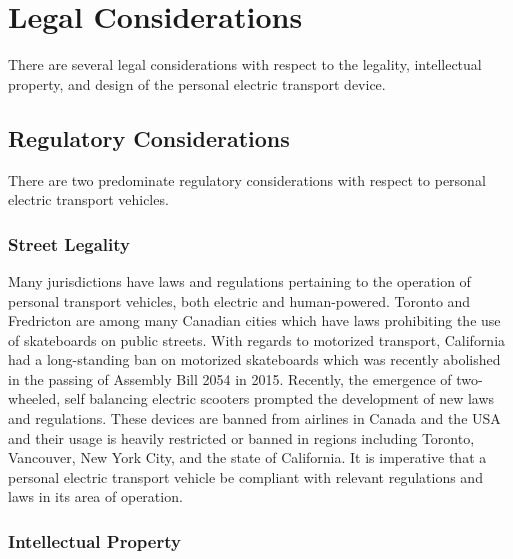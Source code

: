 \documentclass[12pt,letterpaper]{article}
\begin{document}
	
\section{Legal Considerations}
There are several legal considerations with respect to the legality, intellectual property, and design of the personal electric transport device.
\subsection{Regulatory Considerations}
There are two predominate regulatory considerations with respect to personal electric transport vehicles.

\subsubsection{Street Legality}

Many jurisdictions have laws and regulations pertaining to the operation of personal transport vehicles, both electric and human-powered. 
Toronto and Fredricton are among many Canadian cities which have laws prohibiting the use of skateboards on public streets. \cite{TOLaws}
With regards to motorized transport, California had a long-standing ban on motorized skateboards which was recently abolished in the passing of Assembly Bill 2054 in 2015. \cite{OCLaws} \cite{WSJLaws}
Recently, the emergence of two-wheeled, self balancing electric scooters prompted the development of new laws and regulations. 
These devices are banned from airlines in Canada and the USA and their usage is heavily restricted or banned in regions including Toronto, Vancouver, New York City, and the state of California. \cite{leetboard}
It is imperative that a personal electric transport vehicle be compliant with relevant regulations and laws in its area of operation.


\subsubsection{Intellectual Property}
\end{document}
